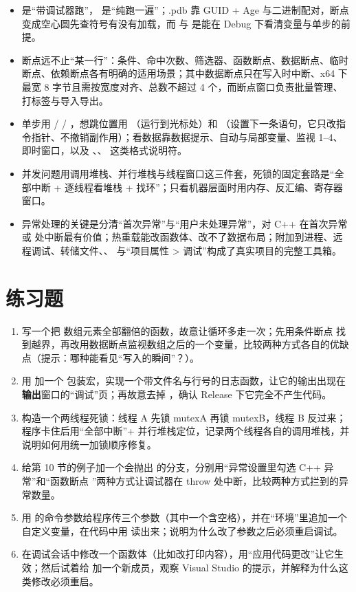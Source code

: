 {{\begin{itemize}
  \item {} 是“带调试器跑”， 是“纯跑一遍”；.pdb 靠 GUID + Age 与二进制配对，断点变成空心圆先查符号有没有加载，而  与  是能在 Debug 下看清变量与单步的前提。
  \item 断点远不止“某一行”：条件、命中次数、筛选器、函数断点、数据断点、临时断点、依赖断点各有明确的适用场景；其中数据断点只在写入时中断、x64 下最宽 8 字节且需按宽度对齐、总数不超过 4 个，而断点窗口负责批量管理、打标签与导入导出。
  \item 单步用  /  / ，想跳位置用 （运行到光标处）和 （设置下一条语句，它只改指令指针、不撤销副作用）；看数据靠数据提示、自动与局部变量、监视 1--4、即时窗口，以及 \code{,[N]}、、 这类格式说明符。
  \item 并发问题用调用堆栈、并行堆栈与线程窗口这三件套，死锁的固定套路是“全部中断 + 逐线程看堆栈 + 找环”；只看机器层面时用内存、反汇编、寄存器窗口。
  \item 异常处理的关键是分清“首次异常”与“用户未处理异常”，对 C++ 在首次异常或  处中断最有价值；热重载能改函数体、改不了数据布局；附加到进程、远程调试、转储文件、、 与“项目属性 > 调试”构成了真实项目的完整工具箱。
\end{itemize}

\section{练习题}

\begin{enumerate}
  \item 写一个把  数组元素全部翻倍的函数，故意让循环多走一次；先用条件断点  找到越界，再改用数据断点监视数组之后的一个变量，比较两种方式各自的优缺点（提示：哪种能看见“写入的瞬间”？）。
  \item 用  加一个  包装宏，实现一个带文件名与行号的日志函数，让它的输出出现在\textbf{输出}窗口的“调试”页；再故意去掉 ，确认 Release 下它完全不产生代码。
  \item 构造一个两线程死锁：线程 A 先锁 mutexA 再锁 mutexB，线程 B 反过来；程序卡住后用“全部中断”+ 并行堆栈定位，记录两个线程各自的调用堆栈，并说明如何用统一加锁顺序修复。
  \item 给第 10 节的例子加一个会抛出  的分支，分别用“异常设置里勾选 C++ 异常”和“函数断点 ”两种方式让调试器在 throw 处中断，比较两种方式拦到的异常数量。
  \item 用  的命令参数给程序传三个参数（其中一个含空格），并在“环境”里追加一个自定义变量，在代码中用  读出来；说明为什么改了参数之后必须重启调试。
  \item 在调试会话中修改一个函数体（比如改打印内容），用“应用代码更改”让它生效；然后试着给  加一个新成员，观察 Visual Studio 的提示，并解释为什么这类修改必须重启。
\end{enumerate}

}}
